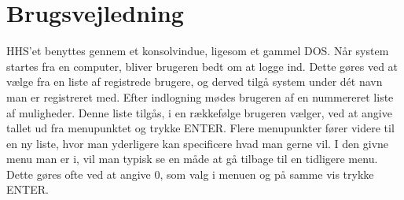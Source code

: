 
\section{Brugsvejledning}
HHS'et benyttes gennem et konsolvindue, ligesom et gammel DOS. Når system startes fra en computer, bliver brugeren bedt om at logge ind. Dette gøres ved at vælge fra en liste af registrede brugere, og derved tilgå system under dét navn man er registreret med. Efter indlogning  mødes brugeren af en nummereret liste af muligheder. Denne liste tilgås, i en rækkefølge brugeren vælger, ved at angive tallet ud fra menupunktet og trykke ENTER. Flere menupunkter fører videre til en ny liste, hvor man yderligere kan specificere hvad man gerne vil. I den givne menu man er i, vil man typisk se en måde at gå tilbage til en tidligere menu. Dette gøres ofte ved at angive 0, som valg i menuen og på samme vis trykke ENTER.